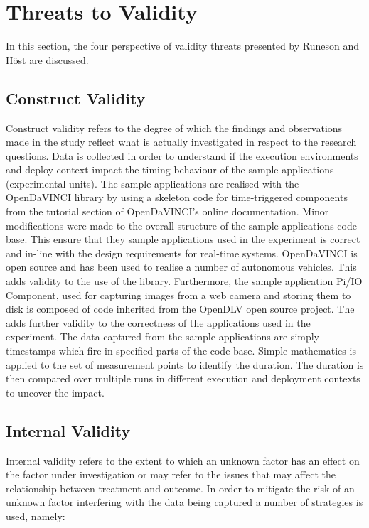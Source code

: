 \iffalse  \fi
\chapter{Threats to Validity}
In this section, the four perspective of validity threats presented by Runeson and H\"{o}st \cite{runeson} are discussed.


\section{Construct Validity}
Construct validity refers to the degree of which the findings and observations made in the study reflect what is actually investigated in respect to the research questions. Data is collected in order to understand if the execution environments and deploy context impact the timing behaviour of the sample applications (experimental units). The sample applications are realised with the OpenDaVINCI library by using a skeleton code for time-triggered components from the tutorial section of OpenDaVINCI's online documentation. Minor modifications were made to the overall structure of the sample applications code base. This ensure that they sample applications used in the experiment is correct and in-line with the design requirements for real-time systems. OpenDaVINCI is open source and has been used to realise a number of autonomous vehicles. This adds validity to the use of the library. Furthermore, the sample application Pi/IO Component, used for capturing images from a web camera and storing them to disk is composed of code inherited from the OpenDLV open source project. The adds further validity to the correctness of the applications used in the experiment. The data captured from the sample applications are simply timestamps which fire in specified parts of the code base. Simple mathematics is applied to the set of measurement points to identify the duration. The duration is then compared over multiple runs in different execution and deployment contexts to uncover the impact.  

\section{Internal Validity}
Internal validity refers to the extent to which an unknown factor has an effect on the factor under investigation or may refer to the issues that may affect the relationship between treatment and outcome. In order to mitigate the risk of an unknown factor interfering with the data being captured a number of strategies is used, namely: \\

